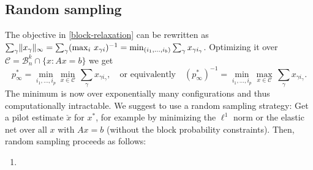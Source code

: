 \documentclass{article} %
\begin{document}
\subsection{Random sampling}
The objective in \eqref{block-relaxation} can be rewritten as
$\sum_\gamma \lVert x_\gamma\rVert_\infty = \sum_\gamma (\max_i\,x_{\gamma
  i})^{-1} = \min_{(i_1, \dots, i_b)} \sum_\gamma x_{\gamma i_\gamma}$.
Optimizing it over $\mathcal C = \mathcal B_n^k \cap \{x : Ax =
b\}$ we get
\begin{equation*}
  p_\infty^* = \min_{i_1, \dots, i_p} \min_{x\in \mathcal C}\,
  {\textstyle \sum_\gamma x_{\gamma i_\gamma}},\quad
  \text{or equivalently}\quad
  (p_\infty^*)^{-1} = \min_{i_1, \dots, i_p} \max_{x\in \mathcal C} \,
  {\textstyle \sum_\gamma x_{\gamma i_\gamma}}.
\end{equation*}
The minimum is now over exponentially many configurations and thus
computationally intractable. We suggest to use a random sampling
strategy: Get a pilot estimate $\check x$ for $x^*$, for example by
minimizing the $\ell^1$ norm or the elastic net over all $x$ with $Ax
= b$ (without the block probability constraints). Then, random
sampling proceeds as follows:
\begin{enumerate}
  \item 
\end{enumerate}
\end{document}
